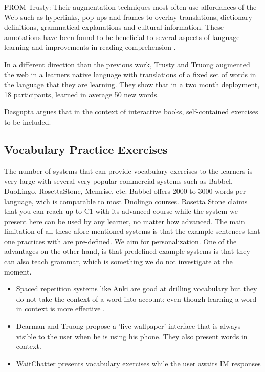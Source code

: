 FROM Trusty: Their augmentation techniques most often use affordances of the Web such as hyperlinks, pop ups and frames to overlay translations, dictionary definitions, grammatical explanations and cultural information. These annotations have been found to be beneficial to several aspects of language learning \cite{DeRidder02-Links} and improvements in reading comprehension \cite{Sanko06-Effects}.



In a different direction than the previous work, Trusty and Truong augmented the web in a learners native language with translations of a fixed set of words in the language that they are learning\cite{Trus11web}. They show that in a two month deployment, 18 participants, learned in average 50 new words.

Dasgupta argues that in the context of interactive books, self-contained exercises to be included. \cite{Dasgupta10-Play}

\subsection{Vocabulary Practice Exercises}

The number of systems that can provide vocabulary exercises to the learners is very large with several very popular commercial systems such as Babbel, DuoLingo, RosettaStone, Memrise, etc. Babbel offers 2000 to 3000 words per language, wich is comparable to most Duolingo courses. Rosetta Stone claims that you can reach up to C1 with its advanced course while the system we present here can be used by any learner, no matter how advanced. The main limitation of all these afore-mentioned systems is that the example sentences that one practices with are pre-defined. We aim for personalization. One of the advantages on the other hand, is that predefined example systems is that they can also teach grammar, which is something we do not investigate at the moment.


\begin{itemize}
	\item Spaced repetition systems like Anki are good at drilling vocabulary but they do not take the context of a word into account; even though learning a word in context is more effective \cite{nagy95-context}.

	\item \cite{Dear12-ImplicitAcquisition} Dearman and Truong propose a 'live wallpaper' interface that is always visible to the user when he is using his phone. They also present words in context. 

	\item \cite{Cai15-wait} WaitChatter presents vocabulary exercises while the user awaits IM responses


\end{itemize}




